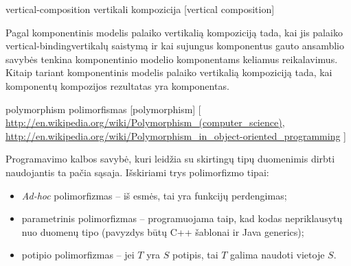 \begin{glossary}
\begin{entry}
  \end{entry}

  \begin{entry}%
    {vertical-composition}%
    {vertikali kompozicija}%
    [vertical composition]

    Pagal \cite[599]{classification-framework-for-scm} komponentinis
    modelis palaiko vertikalią kompoziciją tada, kai jis palaiko
    \gls{vertical-binding}{vertikalų saistymą} ir kai sujungus komponentus
    gauto ansamblio savybės tenkina komponentinio modelio komponentams
    keliamus reikalavimus. Kitaip tariant komponentinis modelis
    palaiko vertikalią kompoziciją tada, kai komponentų kompozijos
    rezultatas yra komponentas.
  
  \end{entry}


  \begin{entry}%
    {polymorphism}%
    {polimorfismas}%
    [polymorphism]%
    [%
    \url{http://en.wikipedia.org/wiki/Polymorphism_(computer_science)}, %
    \url{http://en.wikipedia.org/wiki/Polymorphism_in_object-oriented_programming}%
    ]%

    Programavimo kalbos savybė, kuri leidžia su skirtingų tipų duomenimis
    dirbti naudojantis ta pačia sąsaja. Išskiriami trys polimorfizmo tipai:
    \begin{itemize}
      \item \emph{Ad-hoc} polimorfizmas  –
        iš esmės, tai yra funkcijų perdengimas;
      \item parametrinis polimorfizmas  –
        programuojama taip, kad kodas nepriklausytų nuo duomenų tipo
        (pavyzdys būtų C++ šablonai ir Java generics);
      \item potipio polimorfizmas  – 
        jei $T$ yra $S$ potipis, tai $T$ galima naudoti vietoje $S$.
    \end{itemize}
    
  \end{entry}
\end{glossary}

